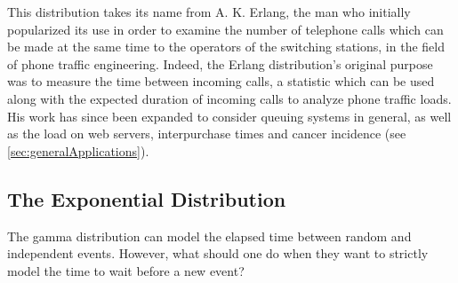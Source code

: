 \documentclass[12pt]{article}
\begin{document}
This distribution takes its name from A. K. Erlang, the man who initially popularized its use in order to examine the
number of telephone calls which can be made at the same time to the operators of the switching stations, in the field of
phone traffic engineering. Indeed, the Erlang distribution's original purpose was to measure the time between incoming
calls, a statistic which can be used along with the expected duration of incoming calls to analyze phone traffic loads.
His work has since been expanded to consider queuing systems in general, as well as the load on web servers,
interpurchase times and cancer incidence (see \autoref{sec:generalApplications})\cite{zachWhatErlangDistribution2020}.


\pagebreak
\subsection{The Exponential Distribution }\label{subsec:specialcases:exponential}
The gamma distribution can model the elapsed time between random and independent events. However, what should one do
when they want to strictly model the time to wait before a new event?
\end{document}
